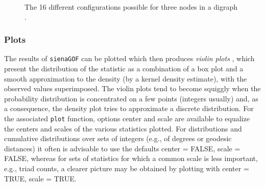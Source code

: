 \documentclass[a4paper,fleqn,11pt]{article}
\newcommand{\+}{\, + \,}
\newcommand{\sfn}[1]{\textsf{#1}}
\begin{document}
\begin{figure}[htb]
\begin{center}
\hspace{5ex}
\end{center}

\caption{The 16 different configurations possible for three nodes in a digraph
\citep[after][]{HollandLeinhardt1976}.}
\label{F_triads}
\end{figure}

\clearpage

\subsubsection{Plots}
The results of \verb!sienaGOF! can be plotted which then produces
\emph{violin plots} \citep{HintzeNelson1998}, which present
the distribution of the statistic as a combination
of a box plot and a smooth approximation to the density
(by a kernel density estimate), with the observed values superimposed.
The violin plots tend to become squiggly when the probability distribution
is concentrated on a few points (integers usually) and, as a consequence,
the density plot tries to approximate a discrete distribution.
For the associated \verb!plot! function, options \sfn{center} and \sfn{scale}
are available to equalize the centers and scales of the various statistics
plotted.
For distributions and cumulative distributions over sets of integers
(e.g., of degrees or geodesic distances)
it often is advisable to use the defaults \sfn{center = FALSE},
\sfn{scale = FALSE}, whereas for sets of statistics for which a common scale
is less important, e.g., triad counts, a clearer picture may be obtained by
plotting with \sfn{center = TRUE}, \sfn{scale = TRUE}.
\end{document}
